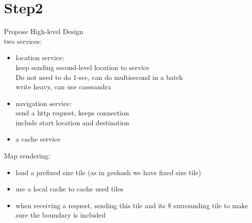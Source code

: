 \documentclass{article}
\begin{document}
\section{Step2}
Propose High-level Design\\
two services:\\
\begin{itemize}
    \item location service:\\
    keep sending second-level location to service\\
    Do not need to do 1-sec, can do multisecond in a batch\\
    write heavy, can use casssandra\\
    \item navigation service:\\
    send a http request, keeps connection\\
    include start location and destination\\
    \item a cache service
\end{itemize}
Map rendering:\\
\begin{itemize}
    \item load a prefixed size tile (as in geohash we have fixed size tile)\\
    \item use a local cache to cache used tiles\\
    \item when receiving a request, sending this tile and its 8 surrounding tile to make sure the boundary is included
\end{itemize}
\end{document}
